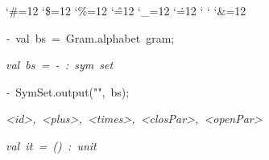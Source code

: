 \begin{list}{}
{\setlength{\leftmargin}{\leftmargini}
\setlength{\rightmargin}{0cm}
\setlength{\itemindent}{0cm}
\setlength{\listparindent}{0cm}
\setlength{\itemsep}{0cm}
\setlength{\parsep}{0cm}
\setlength{\labelsep}{0cm}
\setlength{\labelwidth}{0cm}
\catcode`\#=12
\catcode`\$=12
\catcode`\%=12
\catcode`\^=12
\catcode`\_=12
\catcode`\.=12
\catcode`
\catcode`
\catcode`\&=12
\ttfamily}
\small
\item[]\textsl{-\ }val\ bs\ =\ Gram.alphabet\ gram;
\item[]\textsl{val\ bs\ =\ -\ :\ sym\ set}
\item[]\textsl{-\ }SymSet.output("",\ bs);\ \ 
\item[]\textsl{<id>,\ <plus>,\ <times>,\ <closPar>,\ <openPar>}
\item[]\textsl{val\ it\ =\ ()\ :\ unit}
\end{list}
